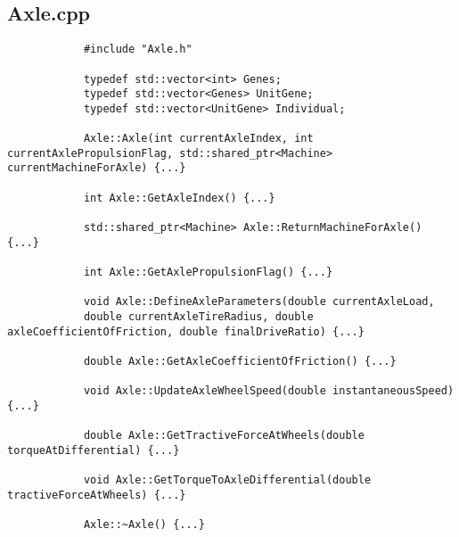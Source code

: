 \documentclass[ExampleMasters.tex]{subfiles}
\begin{document}
		\subsection{Axle.cpp} \label{sec:appendixaxle}
			\begin{verbatim}
			#include "Axle.h"

			typedef std::vector<int> Genes;
			typedef std::vector<Genes> UnitGene;
			typedef std::vector<UnitGene> Individual;

			Axle::Axle(int currentAxleIndex, int currentAxlePropulsionFlag, std::shared_ptr<Machine> currentMachineForAxle) {...}

			int Axle::GetAxleIndex() {...}

			std::shared_ptr<Machine> Axle::ReturnMachineForAxle() {...}

			int Axle::GetAxlePropulsionFlag() {...}

			void Axle::DefineAxleParameters(double currentAxleLoad,
			double currentAxleTireRadius, double axleCoefficientOfFriction, double finalDriveRatio) {...}

			double Axle::GetAxleCoefficientOfFriction() {...}

			void Axle::UpdateAxleWheelSpeed(double instantaneousSpeed) {...}

			double Axle::GetTractiveForceAtWheels(double torqueAtDifferential) {...}

			void Axle::GetTorqueToAxleDifferential(double tractiveForceAtWheels) {...}

			Axle::~Axle() {...}
			\end{verbatim}
\end{document}

